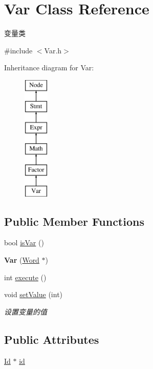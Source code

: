 \hypertarget{class_var}{}\section{Var Class Reference}
\label{class_var}


变量类  




{\ttfamily \#include $<$Var.\+h$>$}

Inheritance diagram for Var\+:\begin{figure}[H]
\begin{center}
\leavevmode
\includegraphics[height=6.000000cm]{class_var}
\end{center}
\end{figure}
\subsection*{Public Member Functions}
\begin{DoxyCompactItemize}
\item 
bool \hyperlink{class_var_a50aa6f54310903a8bc36184813a2b9ef}{is\+Var} ()
\item 
\mbox{\label{class_var_ab111df39c1575d7ba1f96f3b89574b8c}} 
{\bfseries Var} (\hyperlink{class_word}{Word} $\ast$)
\item 
int \hyperlink{class_var_a9dc96e803f7b0f9aa519c2c0e0a6bd8f}{execute} ()
\item 
\mbox{\label{class_var_af0f42d31f5001ff4d4781b9ba199a612}} 
void \hyperlink{class_var_af0f42d31f5001ff4d4781b9ba199a612}{set\+Value} (int)
\begin{DoxyCompactList}\small\item\em 设置变量的值 \end{DoxyCompactList}\end{DoxyCompactItemize}
\subsection*{Public Attributes}
\begin{DoxyCompactItemize}
\item 
\hyperlink{class_id}{Id} $\ast$ \hyperlink{class_var_a3e5c7c9425da4659290da5c0553c7dc6}{id}
\end{DoxyCompactItemize}
